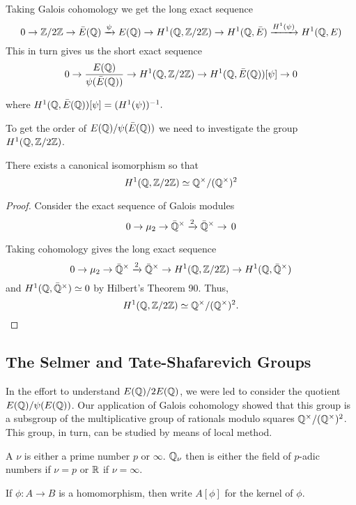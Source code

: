 \documentclass[12pt, a4paper]{amsart}
\begin{document}
Taking Galois cohomology we get the long exact sequence
\[ 0 \rightarrow {\mathbb Z} / 2{\mathbb Z} \rightarrow \bar{E}({\mathbb Q}) \xrightarrow[]{\psi} E({\mathbb Q})
  \rightarrow H^1({\mathbb Q}, {\mathbb Z}/2{\mathbb Z}) \rightarrow H^1({\mathbb Q}, \bar{E}) \xrightarrow{H^1(\psi)}
  H^1({\mathbb Q}, E)\]
This in turn gives us the short exact sequence
\[ 0 \rightarrow \frac{E({\mathbb Q})}{\psi(\bar{E} ({\mathbb Q}))} \rightarrow
  H^1({\mathbb Q}, {\mathbb Z} / 2{\mathbb Z}) \rightarrow H^1({\mathbb Q}, \bar{E}({\mathbb Q}))[\psi] \rightarrow 0\]

where $H^1({\mathbb Q},\bar{E}({\mathbb Q}))[\psi] = (H^1(\psi))^{-1}.$ \vspace{3mm}

To get the order of $E({\mathbb Q}) / \psi(\bar{E}({\mathbb Q}))$ we need to investigate the group
$H^1({\mathbb Q}, {\mathbb Z}/2{\mathbb Z})$.

\begin{prop}
  There exists a canonical isomorphism so that
  \[H^1({\mathbb Q}, {\mathbb Z}/2{\mathbb Z}) \simeq {\mathbb Q}^{\times} / ({\mathbb Q}^{\times})^2\]
\end{prop}
\begin{proof}
Consider the exact sequence of Galois modules
\[0 \rightarrow \mu_2 \rightarrow \bar{{\mathbb Q}}^{\times} \xrightarrow[]{2} \bar{{\mathbb Q}}^{\times} \rightarrow
  \, 0 \]

Taking cohomology gives the long exact sequence
\[ 0 \rightarrow \mu_2 \rightarrow \bar{{\mathbb Q}}^{\times} \xrightarrow[]{2} \bar{{\mathbb Q}}^{\times} \rightarrow H^1({\mathbb Q}, {\mathbb Z}/2{\mathbb Z})
  \rightarrow H^1({\mathbb Q}, \bar{{\mathbb Q}}^{\times})\]
and $H^1({\mathbb Q}, \bar{{\mathbb Q}}^{\times}) \simeq 0$ by Hilbert's Theorem 90. Thus,
\[H^1({\mathbb Q}, {\mathbb Z}/2{\mathbb Z}) \simeq {\mathbb Q}^{\times}/({\mathbb Q}^{\times})^2. \]
\end{proof}

\subsection{The Selmer and Tate-Shafarevich Groups}

In the effort to understand $E({\mathbb Q})/2E({\mathbb Q})$, we were led to consider the quotient
$E({\mathbb Q}) / \psi(E({\mathbb Q}))$. Our application of Galois cohomology showed that this
group is a subsgroup of the multiplicative group of rationals modulo squares
${\mathbb Q}^{\times} / ({\mathbb Q}^{\times})^2$. This group, in turn, can be studied by means
of local method.

\begin{defn}
  A  $\nu$ is either a prime number $p$ or $\infty$. ${\mathbb Q}_\nu$ then is
  either the field of $p$-adic numbers if $\nu = p$ or ${\mathbb R}$ if $\nu = \infty$.
\end{defn}

\begin{defn}
  If $\phi: A \rightarrow B$ is a homomorphism, then write $A[\phi]$ for the
  kernel of $\phi$.
\end{defn}
\end{document}

